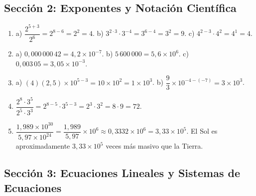\documentclass[12pt, letterpaper]{article}
\begin{document}
  \subsection*{Sección 2: Exponentes y Notación Científica}

  \begin{enumerate}[leftmargin=*, label=\textbf{\arabic*.}]
    \item a) $\dfrac{2^{5+3}}{2^6} = 2^{8-6} = 2^2 = 4$.
          \quad b) $3^{2 \cdot 3} \cdot 3^{-4} = 3^{6-4} = 3^2 = 9$.
          \quad c) $4^{2-3} \cdot 4^{2} = 4^{1} = 4$.

    \item a) $0{,}000\,000\,42 = 4{,}2 \times 10^{-7}$. \quad b) $5\,600\,000 = 5{,}6 \times 10^{6}$. \quad c) $0{,}003\,05 = 3{,}05 \times 10^{-3}$.

    \item a) $(4)(2{,}5) \times 10^{5-3} = 10 \times 10^{2} = 1 \times 10^{3}$.
          \quad b) $\dfrac{9}{3} \times 10^{-4-(-7)} = 3 \times 10^{3}$.

    \item $\dfrac{2^{8} \cdot 3^{5}}{2^{5} \cdot 3^{3}} = 2^{8-5} \cdot 3^{5-3} = 2^{3} \cdot 3^{2} = 8 \cdot 9 = 72$.

    \item $\dfrac{1{,}989 \times 10^{30}}{5{,}97 \times 10^{24}} = \dfrac{1{,}989}{5{,}97} \times 10^{6} \approx 0{,}3332 \times 10^{6} = 3{,}33 \times 10^{5}$.
          El Sol es aproximadamente $3{,}33 \times 10^5$ veces más masivo que la Tierra.
  \end{enumerate}

  \newpage

  \subsection*{Sección 3: Ecuaciones Lineales y Sistemas de Ecuaciones}
\end{document}
